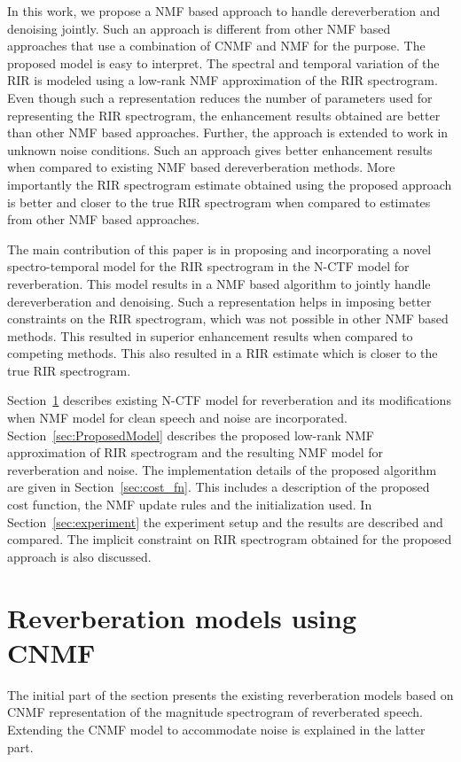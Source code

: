 In this work, we propose a NMF based approach to handle dereverberation and denoising jointly. Such an approach is different from other NMF based approaches that use a combination of CNMF and NMF for the purpose. The proposed model is easy to interpret. The spectral and temporal variation of the RIR is modeled using a low-rank NMF approximation of the RIR spectrogram. Even though such a representation reduces the number of parameters used for representing the RIR spectrogram, the enhancement results obtained are better than other NMF based approaches. Further, the approach is extended to work in unknown noise conditions. Such an approach gives better enhancement results when compared to existing NMF based dereverberation methods. More importantly the RIR spectrogram estimate obtained using the proposed approach is better and closer to the true RIR spectrogram when compared to estimates from other NMF based approaches.

The main contribution of this paper is in proposing and incorporating a novel spectro-temporal model for the RIR spectrogram in the N-CTF model for reverberation. This model results in a NMF based algorithm to jointly handle dereverberation and denoising. Such a representation helps in imposing better constraints on the RIR spectrogram, which was not possible in other NMF based methods. This resulted in superior enhancement results when compared to competing methods.
This also resulted in a RIR estimate which is closer to the true RIR spectrogram.

Section~\ref{sec:deg_model} describes existing N-CTF model for reverberation and its modifications when NMF model for clean speech and noise are incorporated. Section~\ref{sec:ProposedModel} describes the proposed low-rank NMF approximation of RIR spectrogram and the resulting NMF model for reverberation and noise. 
The implementation details of the proposed algorithm are given in Section~\ref{sec:cost_fn}. This includes a description of the proposed cost function, the NMF update rules and the initialization used. In Section~\ref{sec:experiment} the experiment setup and the results are described and compared. The implicit constraint on RIR spectrogram obtained for the proposed approach is also discussed.

\section{Reverberation models using CNMF}
\label{sec:deg_model}
The initial part of the section presents the existing reverberation models based on CNMF representation of the magnitude spectrogram of reverberated speech. Extending the CNMF  model to accommodate noise is explained in the latter part.

